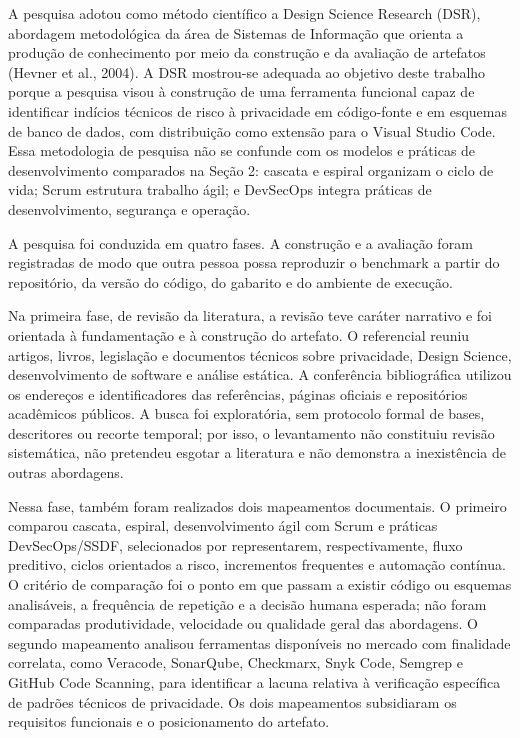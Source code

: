 \documentclass[12pt,a4paper,oneside]{report}
\begin{document}
A pesquisa adotou como método científico a Design Science Research (DSR), abordagem metodológica da área de Sistemas de Informação que orienta a produção de conhecimento por meio da construção e da avaliação de artefatos (Hevner et al., 2004). A DSR mostrou-se adequada ao objetivo deste trabalho porque a pesquisa visou à construção de uma ferramenta funcional capaz de identificar indícios técnicos de risco à privacidade em código-fonte e em esquemas de banco de dados, com distribuição como extensão para o Visual Studio Code. Essa metodologia de pesquisa não se confunde com os modelos e práticas de desenvolvimento comparados na Seção 2: cascata e espiral organizam o ciclo de vida; Scrum estrutura trabalho ágil; e DevSecOps integra práticas de desenvolvimento, segurança e operação.

A pesquisa foi conduzida em quatro fases. A construção e a avaliação foram registradas de modo que outra pessoa possa reproduzir o benchmark a partir do repositório, da versão do código, do gabarito e do ambiente de execução.

Na primeira fase, de revisão da literatura, a revisão teve caráter narrativo e foi orientada à fundamentação e à construção do artefato. O referencial reuniu artigos, livros, legislação e documentos técnicos sobre privacidade, Design Science, desenvolvimento de software e análise estática. A conferência bibliográfica utilizou os endereços e identificadores das referências, páginas oficiais e repositórios acadêmicos públicos. A busca foi exploratória, sem protocolo formal de bases, descritores ou recorte temporal; por isso, o levantamento não constituiu revisão sistemática, não pretendeu esgotar a literatura e não demonstra a inexistência de outras abordagens.

Nessa fase, também foram realizados dois mapeamentos documentais. O primeiro comparou cascata, espiral, desenvolvimento ágil com Scrum e práticas DevSecOps/SSDF, selecionados por representarem, respectivamente, fluxo preditivo, ciclos orientados a risco, incrementos frequentes e automação contínua. O critério de comparação foi o ponto em que passam a existir código ou esquemas analisáveis, a frequência de repetição e a decisão humana esperada; não foram comparadas produtividade, velocidade ou qualidade geral das abordagens. O segundo mapeamento analisou ferramentas disponíveis no mercado com finalidade correlata, como Veracode, SonarQube, Checkmarx, Snyk Code, Semgrep e GitHub Code Scanning, para identificar a lacuna relativa à verificação específica de padrões técnicos de privacidade. Os dois mapeamentos subsidiaram os requisitos funcionais e o posicionamento do artefato.
\end{document}
